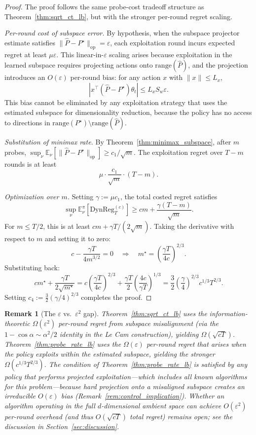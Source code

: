 \documentclass[12pt]{article}
\newcommand{\E}{\mathbb{E}}
\newcommand{\op}{\mathrm{op}}
\newcommand{\DynReg}{\mathrm{DynReg}}
\newcommand{\range}{\mathrm{range}}
\newtheorem{remark}{Remark}
\theoremstyle{plain}
\theoremstyle{definition}
\begin{document}
\begin{proof}
The proof follows the same probe-cost tradeoff structure as Theorem~\ref{thm:sqrt_ct_lb}, but with the stronger per-round regret scaling.

\emph{Per-round cost of subspace error.}
By hypothesis, when the subspace projector estimate satisfies $\|\widehat{P} - P^\star\|_{\op} = \varepsilon$, each exploitation round incurs expected regret at least $\mu\varepsilon$. This linear-in-$\varepsilon$ scaling arises because exploitation in the learned subspace requires projecting actions onto $\range(\widehat{P})$, and the projection introduces an $O(\varepsilon)$ per-round bias: for any action $x$ with $\|x\| \le L_x$,
\[
|x^\top(\widehat{P} - P^\star)\theta_t| \le L_x S_w \varepsilon.
\]
This bias cannot be eliminated by any exploitation strategy that uses the estimated subspace for dimensionality reduction, because the policy has no access to directions in $\range(P^\star) \setminus \range(\widehat{P})$.

\emph{Substitution of minimax rate.}
By Theorem~\ref{thm:minimax_subspace}, after $m$ probes, $\sup_\nu \E_\nu[\|\widehat{P} - P^\star\|_{\op}] \ge c_1/\sqrt{m}$. The exploitation regret over $T - m$ rounds is at least
\[
\mu \cdot \frac{c_1}{\sqrt{m}} \cdot (T - m).
\]

\emph{Optimization over $m$.}
Setting $\gamma := \mu c_1$, the total costed regret satisfies
\[
\sup_\nu \E_\nu^\pi[\DynReg_T^{(c)}] \ge cm + \frac{\gamma(T - m)}{\sqrt{m}}.
\]
For $m \le T/2$, this is at least $cm + \gamma T / (2\sqrt{m})$. Taking the derivative with respect to $m$ and setting it to zero:
\[
c - \frac{\gamma T}{4m^{3/2}} = 0
\quad \Longrightarrow \quad
m^\star = \left(\frac{\gamma T}{4c}\right)^{2/3}.
\]
Substituting back:
\[
cm^\star + \frac{\gamma T}{2\sqrt{m^\star}}
= c\left(\frac{\gamma T}{4c}\right)^{2/3} + \frac{\gamma T}{2}\left(\frac{4c}{\gamma T}\right)^{1/3}
= \frac{3}{2}\left(\frac{\gamma}{4}\right)^{2/3} c^{1/3} T^{2/3}.
\]
Setting $c_4 := \frac{3}{2}(\gamma/4)^{2/3}$ completes the proof.
\end{proof}

\begin{remark}[The $\varepsilon$ vs.\ $\varepsilon^2$ gap]
\label{rem:eps_gap_resolved}
Theorem~\ref{thm:sqrt_ct_lb} uses the information-theoretic $\Omega(\varepsilon^2)$ per-round regret from subspace misalignment (via the $1 - \cos\alpha \sim \alpha^2/2$ identity in the Le Cam construction), yielding $\Omega(\sqrt{cT})$.
Theorem~\ref{thm:probe_rate_lb} uses the $\Omega(\varepsilon)$ per-round regret that arises when the policy exploits within the estimated subspace, yielding the stronger $\Omega(c^{1/3}T^{2/3})$.
The condition of Theorem~\ref{thm:probe_rate_lb} is satisfied by any policy that performs projected exploitation---which includes all known algorithms for this problem---because hard projection onto a misaligned subspace creates an irreducible $O(\varepsilon)$ bias (Remark~\ref{rem:control_implication}).
Whether an algorithm operating in the full $d$-dimensional ambient space can achieve $O(\varepsilon^2)$ per-round overhead (and thus $O(\sqrt{cT})$ total regret) remains open; see the discussion in Section~\ref{sec:discussion}.
\end{remark}
\end{document}
